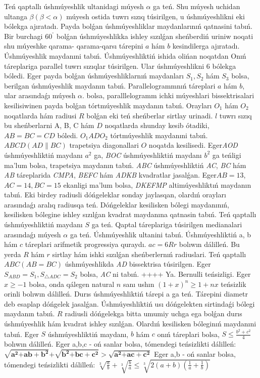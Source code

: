 Teń qaptallı úshmúyeshlik ultanidagi múyesh \(\alpha\) ga teń. Shu múyesh uchidan ultanga \(\beta(\beta < \alpha)\) múyesh ostida tuwrı sızıq túsirilgen, u úshmúyeshlikni eki bólekga ajıratadı. Payda bolǵan úshmúyeshliklar maydanlarınıń qatnasini tabıń.
Bir burchagi \(60^{{^\circ}}\) bolǵan úshmúyeshlikka ishley sızılǵan sheńberdiń uriniw noqati shu múyeshke qarama- qarama-qarsı tárepini \(a\) hám \(b\) kesindilerga ajıratadı. Úshmúyeshlik maydanıni tabıń.
Úshmúyeshliktiń ishida olińan noqatdan Onıń táreplariga parallel tuwrı sızıqlar túsirilgen. Ular úshmúyeshlikni 6 bólekga bóledi. Eger payda bolǵan úshmúyeshliklarnıń maydanları \(S_{1},S_{2}\) hám \(S_{3}\) bolsa, berilgan úshmúyeshlik maydanın tabıń.
Parallelogrammnıń táreplari \(a\) hám \(b\), ular arasındaǵı múyesh \(\alpha\). bolsa, paralllelogramm ichki múyeshlari bissektrisalari kesilisiwinen payda bolǵan tórtmúyeshlik maydanın tabıń.
Orayları \(O_{1}\) hám \(O_{2}\) noqatlarda hám radiusi \(R\) bolǵan eki teń sheńberlar sirtlay urinadi. \(l\) tuwrı sızıq bu sheńberlarni A, B, C hám \(D\) noqatlarda shunday kesib ótadiki, \(AB = BC = CD\) bóledi. \(O_{1}ADO_{2}\) tórtmúyeshlik maydanıni tabıń.
\(ABCD(AD\| BC)\) trapetsiya diagonallari \(O\) noqatda kesilisedi. Eger\emph{AOD} úshmúyeshliktiń maydanı \(a^{2}\) ga, \emph{BOC} úshmúyeshliktiń maydanı \(b^{2}\) ga teńligi ma'lum bolsa, trapetsiya maydanın tabıń.
\emph{ABC} úshmúyeshliktiń \emph{AC}, \emph{BC} hám \emph{AB} táreplarida \emph{CMPA}, \emph{BEFC} hám \emph{ADKB} kvadratlar jasalǵan. Eger\(AB = 13\), \(AC = 14,BC = 15\) ekanligi ma'lum bolsa, \emph{DKEFMP} altimúyeshliktıń maydanın tabıń.
Eki birdey radiusli dóńgeleklar sonday jaylasqan, olardıń orayları arasındaǵı aralıq radiusqa teń. Dóńgeleklar kesilisken bólegi maydanınıń, kesilisken bólegine ishley sızılǵan kvadrat maydanına qatnasin tabıń.
Teń qaptallı úshmúyeshliktiń maydanı \(S\) ga teń. Qaptal táreplariga túsirilgen medianalari arasındaǵı múyesh \(\alpha\) ga teń. Úshmúyeshlik ultanini tabıń.
Úshmúyeshliktiń a, b hám \(c\) táreplari arifmetik progressiya quraydı. \(ac = 6Rr\) bolıwın dálilleń. Bu yerda \(R\) hám \(r\) sirtlay hám ishki sızılǵan sheńberlernıń radiuslari.
Teń qaptallı \(ABC(AB = BC)\) úshmúyeshlikda \emph{AD} bissektrisa túsirilgen. Eger\(S_{ABD} = S_{1},S_{\bigtriangleup ADC} = S_{2}\) bolsa, \emph{AC} ni tabıń.
++++
Ya. Bernulli teńsizligi. Eger\(x \geq - 1\) bolsa, onda qálegen natural \(n\) sanı ushın \((1 + x)^{n} \geq 1 + nx\) teńsizlik orinli bolıwın dálilleń.
Durıs úshmúyeshliktiń tárepi a ga teń. Tárepini diametr deb esaplap dóńgelek jasalǵan. Úshmúyeshliktiń usı dóńgelekten sirtindaǵi bólegi maydanın tabıń.
\(R\) radiusli dóńgelekga bitta umumiy uchga ega bolǵan durıs úshmúyeshlik hám kvadrat ishley sızılǵan. Olardıń kesilisken bóleginıń maydanıni tabıń.
Eger \(S\) úshmúyeshliktiń maydanı, \(b\) hám \(c\) onıń táreplari bolsa, \(S \leq \frac{b^{2} + c^{2}}{4}\) bolıwın dálilleń.
Eger a,b,c - oń sanlar bolsa, tómendegi teńsizlikti dálilleń: \(\sqrt{\mathbf{a}^{\mathbf{2}}\mathbf{+ ab +}\mathbf{b}^{\mathbf{2}}}\mathbf{+}\sqrt{\mathbf{b}^{\mathbf{2}}\mathbf{+ bc +}\mathbf{c}^{\mathbf{2}}}\mathbf{>}\sqrt{\mathbf{a}^{\mathbf{2}}\mathbf{+ ac +}\mathbf{c}^{\mathbf{2}}}\)
Eger a,b - oń sanlar bolsa, tómendegi teńsizlikti dálilleń: \(\sqrt[3]{\frac{a}{b}} + \sqrt[3]{\frac{b}{a}} \leq \sqrt[3]{2(a + b)\left( \frac{1}{a} + \frac{1}{b} \right)}\)